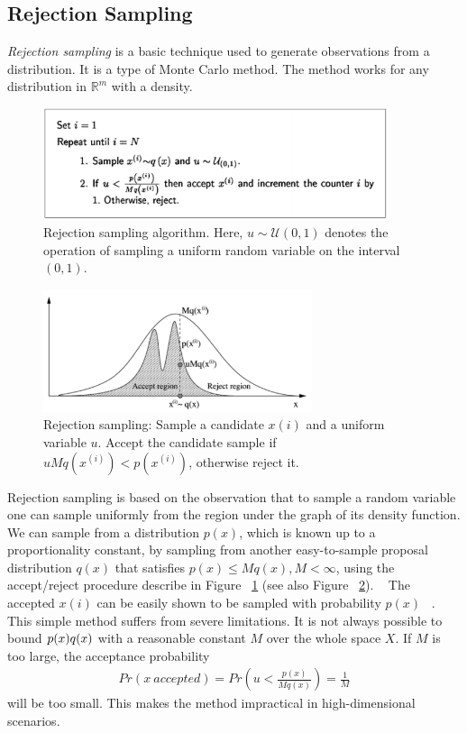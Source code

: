 \subsection{Rejection Sampling}
\textit{Rejection sampling} is a basic technique used to generate observations from a distribution. It is a type of Monte Carlo method. The method works for any distribution in $\mathbb{R}^m$ with a density.

\begin{figure}
    \centering
    \includegraphics[width=0.9\textwidth]{figures/rj1.png}
    \caption{Rejection sampling algorithm. Here, $u \sim \mathscr{U}(0,1)$ denotes the operation of sampling a uniform random variable on the interval $(0,1)$.}
    \label{fig:rj1}
\end{figure}

\begin{figure}
    \centering
    \includegraphics[width=0.7\textwidth]{figures/rj2.png}
    \caption{Rejection sampling: Sample a candidate $x(i)$ and a uniform variable $u$. Accept the candidate sample if $uMq(x^{(i)}) < p(x^{(i)})$, otherwise reject it.}
    \label{fig:rj2}
\end{figure}

Rejection sampling is based on the observation that to sample a random variable one can sample uniformly from the region under the graph of its density function. We can sample from a distribution $p(x)$, which is known up to a proportionality constant, by sampling from another easy-to-sample proposal distribution $q(x)$ that satisﬁes $p(x) \leq Mq(x), M < \infty$, using the accept/reject procedure describe in Figure ~\ref{fig:rj1} (see also Figure ~\ref{fig:rj2}). ~\cite{mcmc}
The accepted $x(i)$ can be easily shown to be sampled with probability $p(x)$ ~\cite{robert}. This simple method suffers from severe limitations. It is not always
possible to bound $p(x) \/ q(x)$ with a reasonable constant $M$ over the whole space $X$. If $M$ is too large, the acceptance probability 
\begin{align*}
  Pr(x ~ accepted) = Pr(u < \frac{p(x)}{Mq(x)}) = \frac{1}{M}
\end{align*}
will be too small. This makes the method impractical in high-dimensional scenarios.

